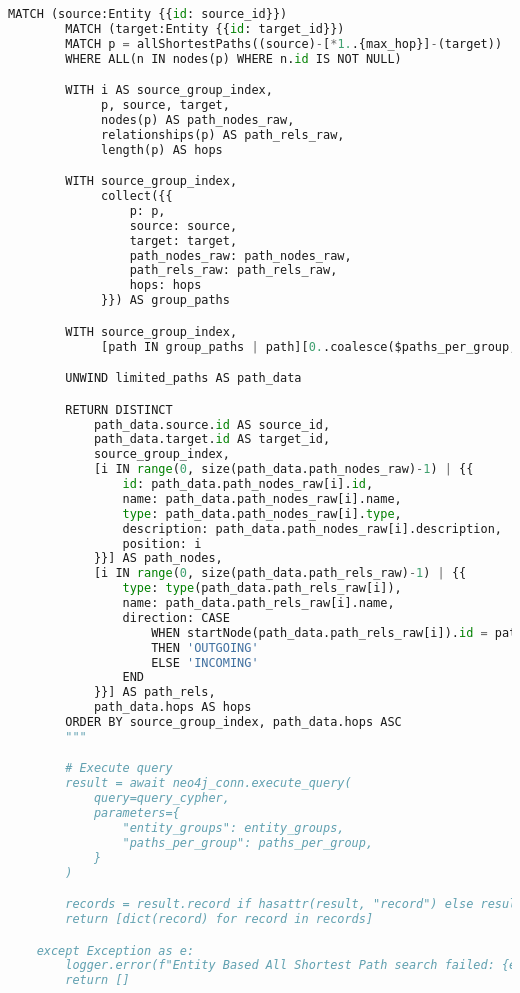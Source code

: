 \begin{lstlisting}[numbers=none, language=python]
        MATCH (source:Entity {{id: source_id}})
        MATCH (target:Entity {{id: target_id}})
        MATCH p = allShortestPaths((source)-[*1..{max_hop}]-(target))
        WHERE ALL(n IN nodes(p) WHERE n.id IS NOT NULL)

        WITH i AS source_group_index, 
             p, source, target, 
             nodes(p) AS path_nodes_raw, 
             relationships(p) AS path_rels_raw,
             length(p) AS hops

        WITH source_group_index, 
             collect({{
                 p: p,
                 source: source,
                 target: target,
                 path_nodes_raw: path_nodes_raw,
                 path_rels_raw: path_rels_raw,
                 hops: hops
             }}) AS group_paths

        WITH source_group_index,
             [path IN group_paths | path][0..coalesce($paths_per_group, 10)] AS limited_paths

        UNWIND limited_paths AS path_data

        RETURN DISTINCT
            path_data.source.id AS source_id,
            path_data.target.id AS target_id,
            source_group_index,
            [i IN range(0, size(path_data.path_nodes_raw)-1) | {{
                id: path_data.path_nodes_raw[i].id,
                name: path_data.path_nodes_raw[i].name,
                type: path_data.path_nodes_raw[i].type,
                description: path_data.path_nodes_raw[i].description,
                position: i
            }}] AS path_nodes,
            [i IN range(0, size(path_data.path_rels_raw)-1) | {{
                type: type(path_data.path_rels_raw[i]),
                name: path_data.path_rels_raw[i].name,
                direction: CASE 
                    WHEN startNode(path_data.path_rels_raw[i]).id = path_data.path_nodes_raw[i].id 
                    THEN 'OUTGOING' 
                    ELSE 'INCOMING' 
                END
            }}] AS path_rels,
            path_data.hops AS hops
        ORDER BY source_group_index, path_data.hops ASC
        """

        # Execute query
        result = await neo4j_conn.execute_query(
            query=query_cypher,
            parameters={
                "entity_groups": entity_groups,
                "paths_per_group": paths_per_group,
            }
        )

        records = result.record if hasattr(result, "record") else result
        return [dict(record) for record in records]

    except Exception as e:
        logger.error(f"Entity Based All Shortest Path search failed: {e}")
        return []
\end{lstlisting}